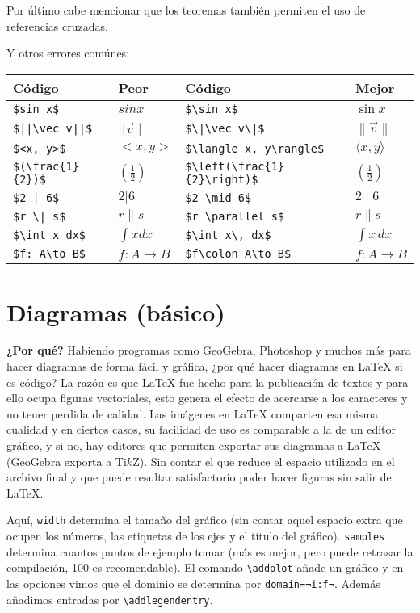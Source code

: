 Por último cabe mencionar que los teoremas también permiten el uso de referencias cruzadas.

Y otros errores comúnes:
\begin{longtable}{|ll|ll|}
	\hline
	Código & Peor & Código & Mejor \\
	\hline
	\endhead

	\hline
	\endfoot

	\lstinline|$sin x$| & $sin x$ & \lstinline|$\sin x$| & $\sin x$ \\
	\lstinline?$||\vec v||$? & $||\vec v||$ & \lstinline?$\|\vec v\|$? & $\|\vec v\|$ \\
	\lstinline?$<x, y>$? & $<x, y>$ & \lstinline?$\langle x, y\rangle$? & $\langle x, y\rangle$ \\
	\lstinline?$(\frac{1}{2})$? & $\displaystyle (\frac{1}{2}) $ & \lstinline|$\left(\frac{1}{2}\right)$| & $\displaystyle \left(\frac{1}{2}\right) $ \\
	\lstinline?$2 | 6$? & $2 | 6$ & \lstinline|$2 \mid 6$| & $2 \mid 6$ \\
	\lstinline?$r \| s$? & $r \| s$ & \lstinline|$r \parallel s$| & $r \parallel s$ \\
	\lstinline|$\int x dx$| & $\int x dx$ & \lstinline|$\int x\, dx$| & $\int x\, dx$ \\
	\lstinline|$f: A\to B$| & $f: A\to B$ & \lstinline|$f\colon A\to B$| & $f\colon A\to B$ \\
\end{longtable}

\section{Diagramas (básico)}
\textbf{¿Por qué?} Habiendo programas como GeoGebra, Photoshop y muchos más para hacer diagramas de forma fácil y gráfica, ¿por qué hacer diagramas en \LaTeX{} si es código? La razón es que \LaTeX{} fue hecho para la publicación de textos y para ello ocupa figuras vectoriales, esto genera el efecto de acercarse a los caracteres y no tener perdida de calidad.
Las imágenes en \LaTeX{} comparten esa misma cualidad y en ciertos casos, su facilidad de uso es comparable a la de un editor gráfico, y si no, hay editores que permiten exportar sus diagramas a \LaTeX{} (GeoGebra exporta a Ti$k$Z). Sin contar el que reduce el espacio utilizado en el archivo final y que puede resultar satisfactorio poder hacer figuras sin salir de \LaTeX{}.

Aquí, \texttt{width} determina el tamaño del gráfico (sin contar aquel espacio extra que ocupen los números, las etiquetas de los ejes y el título del gráfico). \texttt{samples} determina cuantos puntos de ejemplo tomar (más es mejor, pero puede retrasar la compilación, 100 es recomendable). El comando \lstinline|\addplot| añade un gráfico y en las opciones vimos que el dominio se determina por \lstinline|domain=¬i:f¬|. Además añadimos entradas por \lstinline|\addlegendentry|.

